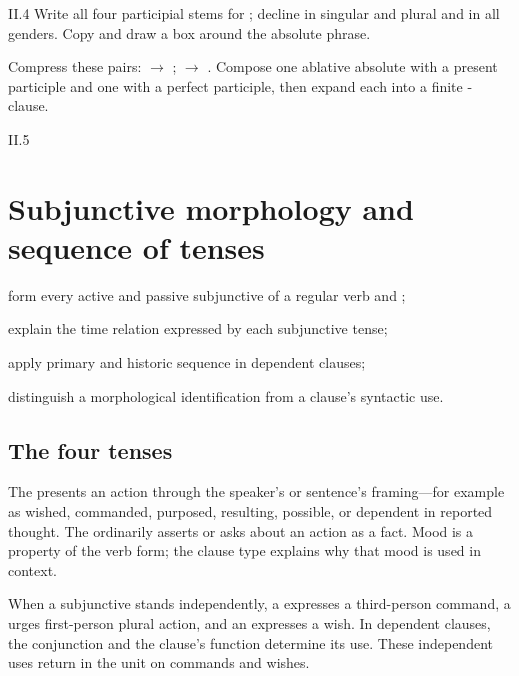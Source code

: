 \begin{courseunit}{II.4}
Write all four participial stems for ; decline
 in singular and plural and  in all genders.  Copy
 and draw a box around the absolute phrase.

Compress these pairs:  $\rightarrow$
; 
$\rightarrow$ .  Compose one ablative absolute
with a present participle and one with a perfect participle, then expand each into a finite
-clause.



\end{courseunit}

\begin{courseunit}{II.5}
\chapter{Subjunctive morphology and sequence of tenses}

\begin{learningobjectives}
  \item form every active and passive subjunctive of a regular verb and ;
  \item explain the time relation expressed by each subjunctive tense;
  \item apply primary and historic sequence in dependent clauses;
  \item distinguish a morphological identification from a clause's syntactic use.
\end{learningobjectives}

\section{The four tenses}

The  presents an action through the speaker's or
sentence's framing---for example as wished, commanded, purposed, resulting,
possible, or dependent in reported thought. The  ordinarily
asserts or asks about an action as a fact. Mood is a property of the verb form;
the clause type explains why that mood is used in context.

When a subjunctive stands independently, a  expresses a
third-person command, a  urges first-person plural action, and
an  expresses a wish. In dependent clauses, the conjunction and
the clause's function determine its use. These independent uses return in the
unit on commands and wishes.


\end{courseunit}
